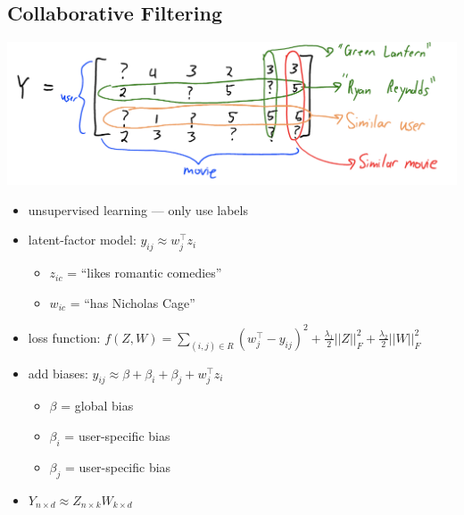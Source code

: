 \documentclass[10pt,landscape,a4paper]{article}
\begin{document}
\begin{multicols*}{5}
\subsection{Collaborative Filtering}
\includegraphics[scale=0.1]{user-item_matrix}
\begin{itemize}
    \item unsupervised learning --- only use labels
    \item latent-factor model: \(y_{ij} \approx w_j^\intercal z_i\)
    \begin{itemize}
        \item \(z_{ic}\) =  ``likes romantic comedies''
        \item \(w_{ic}\) =  ``has Nicholas Cage''
    \end{itemize}
    \item loss function: \(f(Z,W) = \sum\limits_{(i,j) \in R} (w_j^\intercal - y_{ij})^2 + \frac{\lambda_1}{2} ||Z||_F^2 + \frac{\lambda_2}{2} ||W||_F^2\)
    \item add biases: \(y_{ij} \approx \beta + \beta_i + \beta_j + w_j^\intercal z_i\)
    \begin{itemize}
        \item \(\beta \) = global bias
        \item \(\beta_i \) = user-specific bias
        \item \(\beta_j \) = user-specific bias
    \end{itemize}
    \item \(Y_{n \times d} \approx Z_{n \times k} W_{k \times d}\)
\end{itemize}


\end{multicols*}
\end{document}
